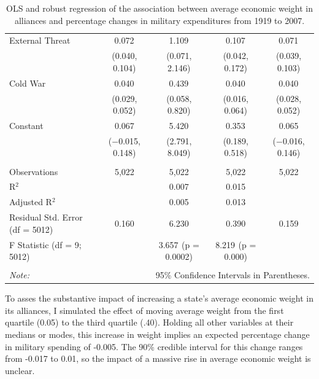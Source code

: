 \documentclass[12pt]{article}
\begin{document}
\begin{table}[!htbp]
\begin{tabular}{@{\extracolsep{0pt}}lcccc}
  External Threat & 0.072$^{}$ & 1.109$^{}$ & 0.107$^{}$ & 0.071$^{}$ \\ 
  & (0.040, 0.104) & (0.071, 2.146) & (0.042, 0.172) & (0.039, 0.103) \\ 
  Cold War & 0.040$^{}$ & 0.439$^{}$ & 0.040$^{}$ & 0.040$^{}$ \\ 
  & (0.029, 0.052) & (0.058, 0.820) & (0.016, 0.064) & (0.028, 0.052) \\ 
  Constant & 0.067 & 5.420$^{}$ & 0.353$^{}$ & 0.065 \\ 
  & ($-$0.015, 0.148) & (2.791, 8.049) & (0.189, 0.518) & ($-$0.016, 0.146) \\ 
 \hline \\[-1.8ex] 
Observations & 5,022 & 5,022 & 5,022 & 5,022 \\ 
R$^{2}$ &  & 0.007 & 0.015 &  \\ 
Adjusted R$^{2}$ &  & 0.005 & 0.013 &  \\ 
Residual Std. Error (df = 5012) & 0.160 & 6.230 & 0.390 & 0.159 \\ 
F Statistic (df = 9; 5012) &  & 3.657$^{}$  (p = 0.0002) & 8.219$^{}$  (p = 0.000) &  \\ 
\hline 
\hline \\[-1.8ex] 
\textit{Note:}  & \multicolumn{4}{r}{95\% Confidence Intervals in Parentheses.} \\ 
\end{tabular} 
  \caption{OLS and robust regression of the association between average economic weight in alliances
and percentage changes in military expenditures from 1919 to 2007.} 
  \label{tab:avg-weight-res} 
\end{table} 

To asses the substantive impact of increasing a state's average economic weight in its alliances, I simulated the effect of moving average weight from the first quartile (0.05) to the third quartile (.40). 
Holding all other variables at their medians or modes, this increase in weight implies an expected percentage change in military spending of -0.005. 
The 90\% credible interval for this change ranges from -0.017 to 0.01, so the impact of a massive rise in average economic weight is unclear. 



\newpage
\singlespace


 
\end{document}
